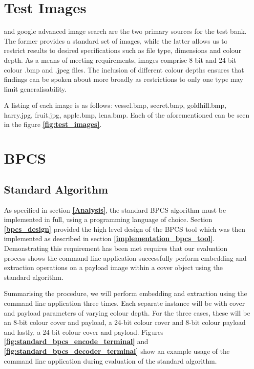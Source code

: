\documentclass{l4proj}
\begin{document}
\section{Test Images}

\citet{testimages} and google advanced image search are the two primary sources for the test bank. The former provides a standard set of images, while the latter allows us to restrict results to desired specifications such as file type, dimensions and colour depth. As a means of meeting requirements, images comprise 8-bit and 24-bit colour .bmp and .jpeg files. The inclusion of different colour depths ensures that findings can be spoken about more broadly as restrictions to only one type may limit generalisability. 

A listing of each image is as follows: vessel.bmp, secret.bmp, goldhill.bmp, harry.jpg, fruit.jpg, apple.bmp, lena.bmp. Each of the aforementioned can be seen in the figure \textbf{\ref{fig:test_images}}.


\section{BPCS}

\subsection{Standard Algorithm}\label{evaluation_standard_algorithm}

As specified in section \textbf{\ref{Analysis}}, the standard BPCS algorithm must be implemented in full, using a programming language of choice. Section \textbf{\ref{bpcs_design}} provided the high level design of the BPCS tool which was then implemented as described in section \textbf{\ref{implementation_bpcs_tool}}. Demonstrating this requirement has been met requires that our evaluation process shows the command-line application successfully perform embedding and extraction operations on a payload image within a cover object using the standard algorithm. 

Summarising the procedure, we will perform embedding and extraction using the command line application three times. Each separate instance will be with cover and payload parameters of varying colour depth. For the three cases, these will be an 8-bit colour cover and payload, a 24-bit colour cover and 8-bit colour payload and lastly, a 24-bit colour cover and payload. Figures \textbf{\ref{fig:standard_bpcs_encode_terminal}} and \textbf{\ref{fig:standard_bpcs_decoder_terminal}} show an example usage of the command line application during evaluation of the standard algorithm.
\end{document}
